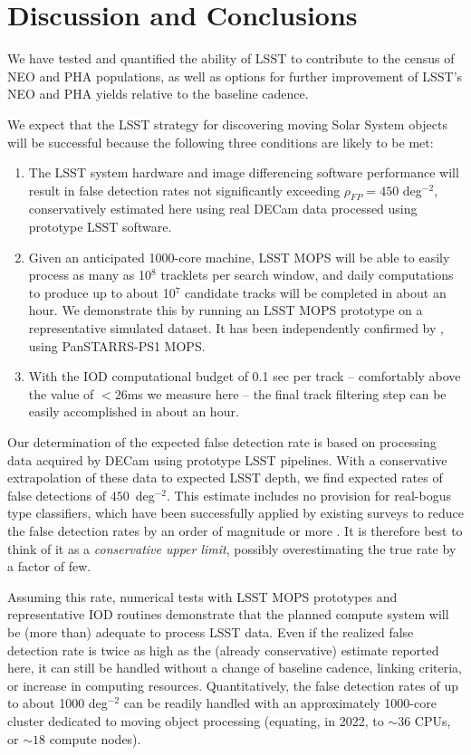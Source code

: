 

\section{Discussion and Conclusions\label{sec:discussion}}

We have tested and quantified the ability of LSST to contribute to the census of NEO and PHA populations, as well as options for further improvement of LSST's NEO and PHA yields relative to the baseline cadence.

We expect that the LSST strategy for discovering moving Solar System objects will be successful because the following three conditions are likely to be met:
\begin{enumerate}
	\item The LSST system hardware and image differencing software performance will result in false detection
	rates not significantly exceeding $\rho_{FP} =  450$ deg$^{-2}$, conservatively estimated here using real DECam data
	processed using prototype LSST software.
	\item Given an anticipated 1000-core machine, LSST MOPS will be able to easily process as many as
	10$^8$ tracklets per search window, and daily computations to produce up to about 10$^7$
	candidate tracks will be completed in about an hour. We demonstrate this by running an LSST MOPS prototype on a representative simulated dataset. It has been independently confirmed by \cite{VeresChesley2017mops}, using PanSTARRS-PS1 MOPS.
	\item With the IOD computational budget of 0.1 sec per track -- comfortably above the value of $<26$ms we measure here -- the final track filtering step can
	be easily accomplished in about an hour.
\end{enumerate}

Our determination of the expected false detection rate is based on processing data acquired by DECam using prototype LSST pipelines. With a conservative extrapolation of these data to expected LSST depth, we find expected rates of false detections of $450$~deg$^{-2}$. This estimate includes no provision for real-bogus type classifiers, which have been successfully applied by existing surveys to reduce the false detection rates by an order of magnitude or more \citep[e.g.][]{goldstein15}. It is therefore best to think of it as a {\it conservative upper limit}, possibly overestimating the true rate by a factor of few.

Assuming this rate, numerical tests with LSST MOPS prototypes and representative IOD routines demonstrate that the planned compute system will be (more than) adequate to
process LSST data. Even if the realized false detection rate is twice as high as
the (already conservative) estimate reported here, it can still be handled without a change of baseline cadence, linking criteria, or
increase in computing resources. Quantitatively, the false detection rates of up to about
1000 deg$^{-2}$ can be readily handled with an approximately 1000-core cluster dedicated to moving object processing (equating, in 2022, to $\sim 36$ CPUs, or $\sim 18$ compute nodes).


